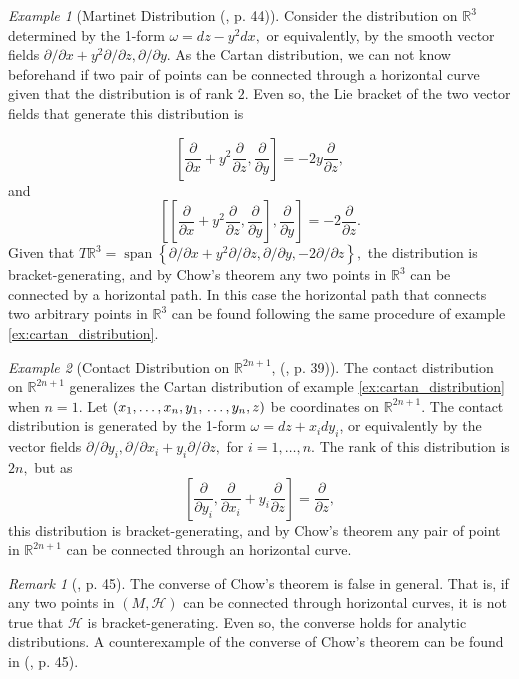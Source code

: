 \documentclass[12pt, letterpaper, reqno]{amsart}
\theoremstyle{definition}
\theoremstyle{plain}
\theoremstyle{remark}
\newtheorem{ex}{Example}
\newtheorem{rem}{Remark}
\begin{document}
\begin{ex}[Martinet Distribution (\cite{montgomery2002tour}, p. 44)]
	Consider the distribution on $ \mathbb{R}^3 $ determined by the 1-form $ \omega = dz-y^2dx, $ or equivalently, by the smooth vector fields $ \partial/\partial x+y^2\partial/\partial z, \partial/\partial y $. As the Cartan distribution, we can not know beforehand if two pair of points can be connected through a horizontal curve given that the distribution is of rank $ 2. $ Even so, the Lie bracket of the two vector fields that generate this distribution is  

	$$ \left[ \frac{\partial }{\partial x} + y^2 \frac{\partial }{\partial z} , \frac{\partial }{\partial y}  \right] =-2y \frac{\partial }{\partial z}, $$ 
	and 
	$$ \left[\left[ \frac{\partial }{\partial x} + y^2 \frac{\partial }{\partial z} , \frac{\partial }{\partial y}  \right], \frac{\partial }{\partial y} \right] = -2 \frac{\partial }{\partial z}.  $$ 
	Given that $ T \mathbb{R}^3 = \operatorname{span} \left\{ \partial/\partial x+ y^2\partial/\partial z, \partial/\partial y, -2\partial/\partial z \right\},  $ the distribution is bracket-generating, and by Chow's theorem any two points in $ \mathbb{R}^3 $ can be connected by a horizontal path. In this case the horizontal path that connects two arbitrary points in $ \mathbb{R}^3 $ can be found following the same procedure of example \ref{ex:cartan_distribution}.
\end{ex}

\begin{ex}[Contact Distribution on $ \mathbb{R}^{2n+1} $, (\cite{montgomery2002tour}, p. 39)]
	The contact distribution on $ \mathbb{R}^{2n+1} $ generalizes the Cartan distribution of example \ref{ex:cartan_distribution} when $ n=1 $. Let $ (x_1,\dots,x_n,y_1,\\\dots, y_n,z) $ be coordinates on $ \mathbb{R}^{2n+1} $. The contact distribution is generated by the 1-form $ \omega = dz+ x_i dy_i$, or equivalently by the vector fields $ \partial/ \partial y_i, \partial/ \partial x_i+ y_i \partial/\partial z, $ for $ i=1,\dots, n. $ The rank of this distribution is $ 2n, $ but as 
	$$ \left[ \frac{\partial }{\partial y_i} , \frac{\partial }{\partial x_i} + y_i \frac{\partial }{\partial z}  \right] = \frac{\partial }{\partial z},  $$ 
	this distribution is bracket-generating, and by Chow's theorem any pair of point in $ \mathbb{R}^{2n+1} $ can be connected through an horizontal curve.
\end{ex}

\begin{rem}[\cite{montgomery2002tour}, p. 45]
	The converse of Chow's theorem is false in general. That is, if any two points in $ (M,\mathcal{H}) $ can be connected through horizontal curves, it is not true that $ \mathcal{H} $ is bracket-generating. Even so, the converse holds for analytic distributions. A counterexample of  the converse of Chow's theorem can be found in (\cite{montgomery2002tour}, p. 45).
\end{rem}
\end{document}
